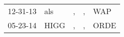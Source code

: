 \begin{supertabular}{lllll}
 12-31-13 &   als &  , &  , &   WAP \\
 05-23-14 &  HIGG &  , &  , &  ORDE \\
\end{supertabular}
